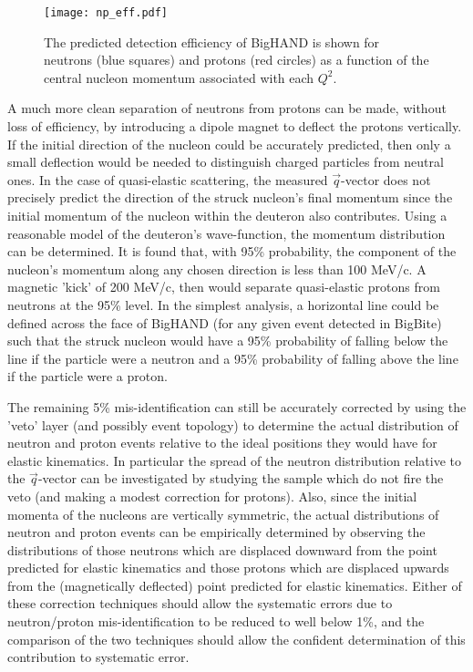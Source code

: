 \documentclass[12pt,letterpaper,oneside]{article}
\begin{document}
\begin{figure}
\texttt{[image: np\_eff.pdf]}\\
\caption{\label{np_eff}
The predicted \cite{BH_simulation}  detection efficiency 
of BigHAND is shown for neutrons
(blue squares) and protons (red circles) as a function of the central nucleon
momentum associated with each $Q^2$.
}
\end{figure}

A much more clean separation of neutrons from protons can be made,
without loss of efficiency, by introducing a dipole magnet to
deflect the protons vertically.  If the initial direction of the
nucleon could be accurately predicted, then only a small deflection
would be needed to distinguish charged particles from neutral ones.
In the case of quasi-elastic scattering, the
measured $\vec q$-vector does not precisely predict the direction of the
struck nucleon's final momentum since the initial momentum of the
nucleon within the deuteron also contributes.  Using a reasonable
model of the deuteron's wave-function\cite{Lomon}, the momentum
distribution can be determined.  It is found that, with 95\% probability,
the component of the nucleon's momentum along any chosen direction is
less than 100 MeV/c.  A magnetic 'kick' of 200 MeV/c, then would
separate quasi-elastic protons from neutrons at the 95\% level.  
In the simplest analysis, a horizontal line could be defined across 
the face of BigHAND (for any given event detected in BigBite) such that the struck nucleon
would have a 95\% probability of falling below the line if the
particle were a neutron and a 95\% probability of falling above the
line if the particle were a proton.  

The remaining 5\%
mis-identification can still be accurately corrected by 
using the 'veto' layer (and possibly event topology) to determine the actual
distribution of neutron and proton events relative to the ideal
positions they would have for elastic kinematics.  In particular the
spread of the neutron distribution relative to the $\vec q$-vector can
be investigated by
studying the sample which do not fire the veto (and making a modest
correction for protons).
Also, since
the initial momenta of the nucleons are vertically symmetric, the
actual distributions of neutron and proton events can be empirically
determined by observing the distributions of those neutrons which are
displaced downward from the point predicted for elastic kinematics and
those protons which are displaced upwards from the (magnetically
deflected)  point predicted for elastic kinematics.  
Either of these correction techniques 
should allow the systematic errors due to neutron/proton
mis-identification to be reduced to well below 1\%, and the
comparison of the two techniques should allow the confident
determination of this contribution to systematic error.
\end{document}
